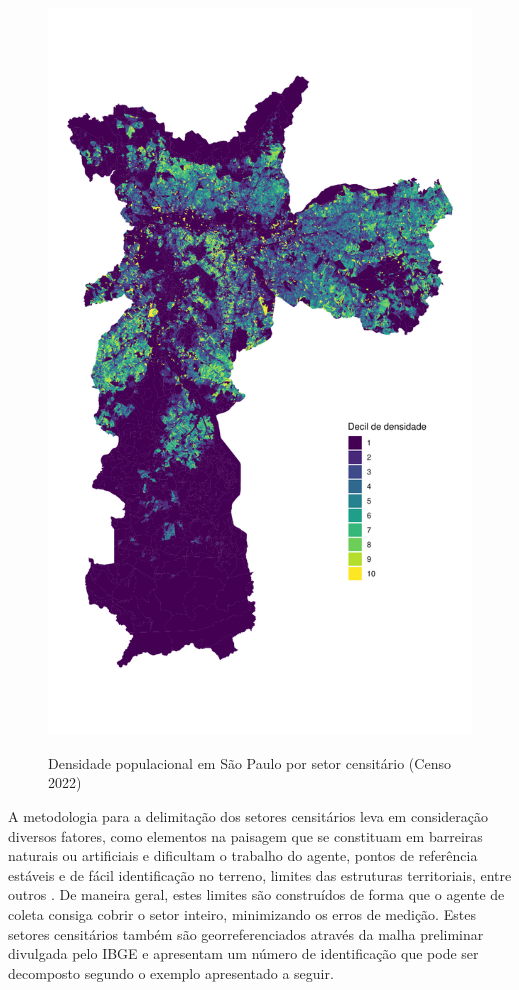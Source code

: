 \begin{figure}[!h]
    \centering
    \caption{Densidade populacional em São Paulo por setor censitário (Censo 2022)}
    \includegraphics[width = .85\linewidth]{imagens/test.pdf}
    \label{fig:populacao}
\end{figure}

A metodologia para a delimitação dos setores censitários leva em consideração diversos fatores, como elementos na paisagem que se constituam em barreiras naturais ou artificiais e dificultam o trabalho do agente, pontos de referência estáveis e de fácil identificação no terreno, limites das estruturas territoriais, entre outros \cite{IBGE2024}. De maneira geral, estes limites são construídos de forma que o agente de coleta consiga cobrir o setor inteiro, minimizando os erros de medição. Estes setores censitários também são georreferenciados através da malha preliminar divulgada pelo IBGE e apresentam um número de identificação que pode ser decomposto segundo o exemplo apresentado a seguir.

